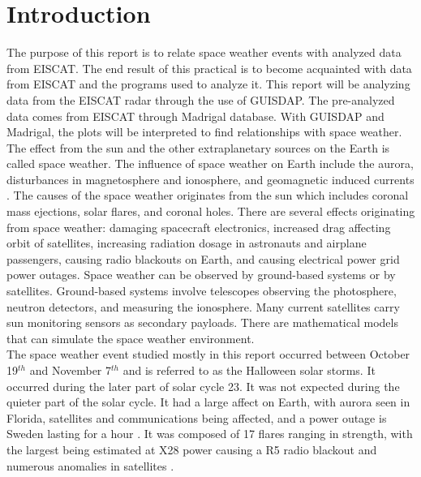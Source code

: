 
\section{Introduction}
The purpose of this report is to relate space weather events with analyzed data from EISCAT.
The end result of this practical is to become acquainted with data from EISCAT and the programs used to analyze it.
This report will be analyzing data from the EISCAT radar through the use of GUISDAP. 
The pre-analyzed data comes from EISCAT through Madrigal database.
With GUISDAP and Madrigal, the plots will be interpreted to find relationships with space weather. \\

The effect from the sun and the other extraplanetary sources on the Earth is called space weather. 
The influence of space weather on Earth include the aurora, disturbances in magnetosphere and ionosphere, and geomagnetic induced currents \cite{I_NOAA_2}. 
The causes of the space weather originates from the sun which includes coronal mass ejections, solar flares, and coronal holes.
There are several effects originating from space weather: damaging spacecraft electronics, increased drag affecting orbit of satellites, increasing radiation dosage in astronauts and airplane passengers, causing radio blackouts on Earth, and causing electrical power grid power outages.
Space weather can be observed by ground-based systems or by satellites. Ground-based systems involve telescopes observing the photosphere, neutron detectors, and measuring the ionosphere.
Many current satellites carry sun monitoring sensors as secondary payloads.
There are mathematical models that can simulate the space weather environment.\\


The space weather event studied mostly in this report occurred between October 19$^{th}$ and November 7$^{th}$ and is referred to as the Halloween solar storms. 
It occurred during the later part of solar cycle 23. It was not expected during the quieter part of the solar cycle.
It had a large affect on Earth, with aurora seen in Florida, satellites and communications being affected, and a power outage is Sweden lasting for a hour \cite{I_NASA_1}. 
It was composed of 17 flares ranging in strength, with the largest being estimated at X28 power causing a R5 radio blackout and numerous anomalies in satellites \cite{I_NOAA}.
